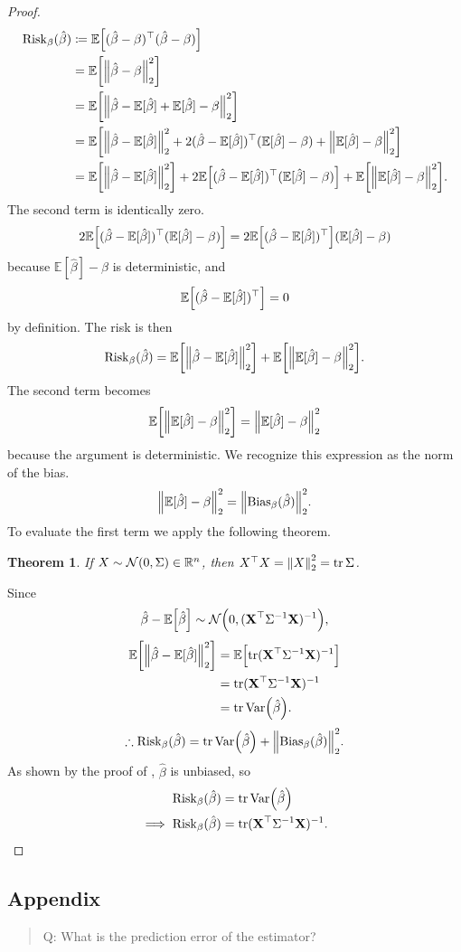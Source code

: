\documentclass[letterpaper, reqno]{amsart}
\newtheorem{theorem}{Theorem}[section]
\numberwithin{equation}{section}
\DeclarePairedDelimiter{\norm}{\lVert}{\rVert}
\newcommand{\T}{\top} %
\newcommand{\vect}[1]{\boldsymbol{\mathbf{#1}}} %
\newcommand{\E}[1]{\mathbb{E}\mleft[#1\mright]}
\newcommand{\Var}[1]{\operatorname{Var}\mleft(#1\mright)}
\newcommand{\R}{\mathbb{R}}  %
\newcommand{\N}[2]{\mathcal{N}\mleft( #1, #2 \mright)}
\newcommand{\Xm}{\vect{X}}
\newcommand{\Bv}{\beta}
\newcommand{\Bvh}{\hat{\beta}}
\newcommand{\Ebh}{\mathbb{E}[\Bvh]}
\DeclareMathOperator{\tr}{tr}
\begin{document}
\begin{proof}
  \begin{alignat*}{3}
    \mathrm{Risk}_\Bv(\Bvh) &\coloneqq \E{(\Bvh - \Bv)^\T(\Bvh - \Bv)} \\
    &= \E{\norm*{\Bvh - \Bv}_2^2} \\
    &= \E{\norm*{\Bvh - \Ebh + \Ebh - \Bv}_2^2} \\
    &= \E{\norm*{\Bvh - \Ebh}_2^2 
      + 2(\Bvh - \Ebh)^\T (\Ebh - \Bv)
      + \norm*{\Ebh - \Bv}_2^2} \\
    &= \E{\norm*{\Bvh - \Ebh}_2^2}
      + 2\E{(\Bvh - \Ebh)^\T (\Ebh - \Bv)} 
      + \E{\norm*{\Ebh - \Bv}_2^2}.
  \end{alignat*}
  The second term is identically zero.
  \[ 2\E{(\Bvh - \Ebh)^\T (\Ebh - \Bv)} = 2\E{(\Bvh - \Ebh)^\T}(\Ebh - \Bv) \]
  because $\Ebh - \Bv$ is deterministic, and 
  \[ \E{(\Bvh - \Ebh)^\T} = 0 \]
  by definition. The risk is then
  \[ \mathrm{Risk}_\Bv(\Bvh) = \E{\norm*{\Bvh - \Ebh}_2^2} + \E{\norm*{\Ebh - \Bv}_2^2}. \]
  The second term becomes
  \[ \E{\norm*{\Ebh - \Bv}_2^2} = \norm*{\Ebh - \Bv}_2^2 \]
  because the argument is deterministic. We recognize this expression as the
  norm of the bias.
  \[ \norm*{\Ebh - \Bv}_2^2 = \norm*{\mathrm{Bias}_\Bv(\Bvh)}_2^2. \]
  To evaluate the first term we apply the following theorem.
  \begin{theorem} \label{thm:normnorm}
    If $X \sim \N{0}{\Sigma} \in \R^n$, then $X^\T X = \norm*{X}_2^2 = \tr \Sigma$.
  \end{theorem}
  Since 
  \[ \Bvh - \E{\Bvh} \sim \N{0}{(\Xm^\T \Sigma^{-1} \Xm)^{-1}}, \]
  \begin{align*}
    \E{\norm*{\Bvh - \Ebh}_2^2} &= \E{\tr (\Xm^\T \Sigma^{-1} \Xm)^{-1}} \\
    &= \tr (\Xm^\T \Sigma^{-1} \Xm)^{-1} \\
    &= \tr \Var{\Bvh}.
  \end{align*}
  \[ \therefore \mathrm{Risk}_\Bv(\Bvh) = \tr \Var{\Bvh} + \norm*{\mathrm{Bias}_\Bv(\Bvh)}_2^2. \]
  As shown by the proof of , $\Bvh$ is
  unbiased, so
  \begin{align*}
    \mathrm{Risk}_\Bv(\Bvh) &= \tr \Var{\Bvh}  \\
    \implies \mathrm{Risk}_\Bv(\Bvh) &= \tr (\Xm^\T \Sigma^{-1} \Xm)^{-1}.
    \qedhere
  \end{align*}
\end{proof}

\subsection*{Appendix} \label{app:prediction_error}
\begin{quote}
  Q: What is the prediction error of the estimator?
\end{quote}
\end{document}
